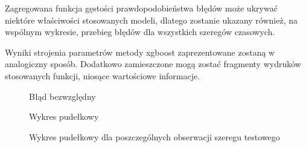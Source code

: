 \documentclass[11pt]{report}
\begin{document}
Zagregowana funkcja gęstości prawdopodobieństwa błędów może ukrywać niektóre właściwości stosowanych modeli, dlatego zostanie ukazany również, na wspólnym  wykresie, przebieg błędów dla wszystkich szeregów czasowych.

Wyniki strojenia parametrów metody xgboost zaprezentowane zostaną w analogiczny sposób.
Dodatkowo zamieszczone mogą zostać fragmenty wydruków stosowanych funkcji, niosące wartościowe informacje.

\begin{figure}
    \centering
    \begin{subfigure}[b]{0.3\textwidth}
        \centering
        \def\svgwidth{\columnwidth}
        
    \end{subfigure}
    \begin{subfigure}[b]{0.3\textwidth}
        \centering
        \def\svgwidth{\columnwidth}
        
    \end{subfigure}
    \begin{subfigure}[b]{0.3\textwidth}
        \centering
        \def\svgwidth{\columnwidth}
        
    \end{subfigure}
     \caption{Błąd bezwzględny}
\end{figure}

\begin{figure}
    \centering
    \begin{subfigure}[b]{0.3\textwidth}
        \centering
        \def\svgwidth{\columnwidth}
        
    \end{subfigure}
    \begin{subfigure}[b]{0.3\textwidth}
        \centering
        \def\svgwidth{\columnwidth}
        
    \end{subfigure}
    \begin{subfigure}[b]{0.3\textwidth}
        \centering
        \def\svgwidth{\columnwidth}
        
    \end{subfigure}
     \caption{Wykres pudełkowy}
\end{figure}

\begin{figure}
    \centering
    \begin{subfigure}[b]{0.3\textwidth}
        \centering
        \def\svgwidth{\columnwidth}
        
    \end{subfigure}
    \begin{subfigure}[b]{0.3\textwidth}
        \centering
        \def\svgwidth{\columnwidth}
        
    \end{subfigure}
    \begin{subfigure}[b]{0.3\textwidth}
        \centering
        \def\svgwidth{\columnwidth}
        
    \end{subfigure}
     \caption{Wykres pudełkowy dla poszczególnych obserwacji szeregu testowego}
\end{figure}
\end{document}
